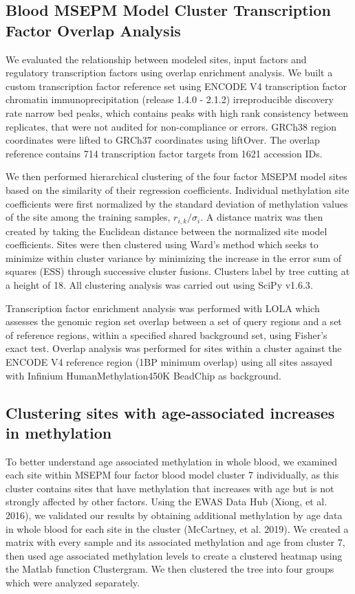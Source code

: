 \documentclass{article}
\begin{document}
{\begin{linenumbers}
\subsection{Blood MSEPM Model Cluster Transcription Factor Overlap Analysis}
We evaluated the relationship between modeled sites, input factors and regulatory transcription factors using overlap enrichment analysis.  
We built a custom transcription factor reference set using ENCODE V4 transcription factor chromatin immunoprecipitation\cite{ENCODE_Project_Consortium2012-oe,Davis2018-ha} 
(release 1.4.0 - 2.1.2)  irreproducible discovery rate narrow bed peaks, 
  which contains peaks with high rank consistency between replicates, that were not audited for non-compliance or errors. 
  GRCh38 region coordinates were lifted to GRCh37 coordinates using liftOver\cite{Hinrichs2006-oq}. The overlap reference 
  contains 714 transcription factor targets from 1621 accession IDs. 

We then performed hierarchical clustering of the four factor MSEPM model sites based on the similarity of their regression coefficients.
Individual methylation site coefficients were first normalized by the standard deviation of methylation values of the site among the training samples, $r_{i,k} / \sigma_{i}$. 
A distance matrix was then created by taking the Euclidean distance between the normalized site model coefficients. Sites were then clustered using Ward’s 
method which seeks to minimize within cluster variance by minimizing the increase in the error sum of squares (ESS) through successive cluster fusions.  
Clusters label by tree cutting at a height of 18. All clustering analysis was carried out using SciPy v1.6.3\cite{Virtanen2020-mm}.   

Transcription factor enrichment analysis was performed with  LOLA\cite{Sheffield2016-wg} which assesses the genomic 
region set overlap between a set of query regions and a set of reference regions, within a specified shared background set, 
using Fisher's exact test. Overlap analysis was performed for sites within a cluster against the ENCODE V4 reference region 
(1BP minimum overlap) using all sites assayed with Infinium HumanMethylation450K BeadChip as background.

\subsection{Clustering sites with age-associated increases in methylation}
To better understand age associated methylation in whole blood, we examined each site within MSEPM four factor blood model cluster 7 individually, 
as this cluster contains sites that have methylation that increases with age but is not strongly affected by other factors. 
Using the EWAS Data Hub (Xiong, et al. 2016), we validated our results by obtaining additional methylation by age data in 
whole blood for each site in the cluster (McCartney, et al. 2019).  We created a matrix with every sample and its associated 
methylation and age from cluster 7, then used age associated methylation levels to create a clustered heatmap using the Matlab 
function Clustergram. We then clustered the tree into four groups which were analyzed separately.


\end{linenumbers}}
\end{document}
